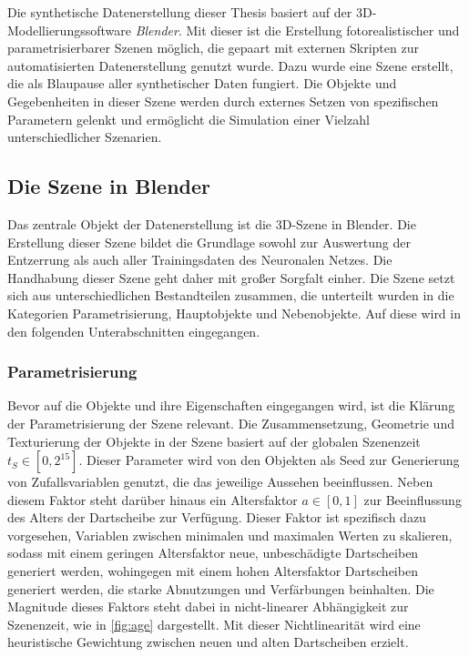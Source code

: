 Die synthetische Datenerstellung dieser Thesis basiert auf der 3D-Modellierungssoftware \textit{Blender}\cite{blender}. Mit dieser ist die Erstellung fotorealistischer und parametrisierbarer Szenen möglich, die gepaart mit externen Skripten zur automatisierten Datenerstellung genutzt wurde. Dazu wurde eine Szene erstellt, die als Blaupause aller synthetischer Daten fungiert. Die Objekte und Gegebenheiten in dieser Szene werden durch externes Setzen von spezifischen Parametern gelenkt und ermöglicht die Simulation einer Vielzahl unterschiedlicher Szenarien.

\subsection{Die Szene in Blender}
\label{sec:impl:daten:blender}

Das zentrale Objekt der Datenerstellung ist die 3D-Szene in Blender. Die Erstellung dieser Szene bildet die Grundlage sowohl zur Auswertung der Entzerrung als auch aller Trainingsdaten des Neuronalen Netzes. Die Handhabung dieser Szene geht daher mit großer Sorgfalt einher. Die Szene setzt sich aus unterschiedlichen Bestandteilen zusammen, die unterteilt wurden in die Kategorien Parametrisierung, Hauptobjekte und Nebenobjekte. Auf diese wird in den folgenden Unterabschnitten eingegangen.


\subsubsection{Parametrisierung}
\label{sec:impl:daten:blender:parameter}

Bevor auf die Objekte und ihre Eigenschaften eingegangen wird, ist die Klärung der Parametrisierung der Szene relevant. Die Zusammensetzung, Geometrie und Texturierung der Objekte in der Szene basiert auf der globalen Szenenzeit $t_S \in [0, 2^{15}]$. Dieser Parameter wird von den Objekten als Seed zur Generierung von Zufallsvariablen genutzt, die das jeweilige Aussehen beeinflussen. Neben diesem Faktor steht darüber hinaus ein Altersfaktor $a \in [0, 1]$ zur Beeinflussung des Alters der Dartscheibe zur Verfügung. Dieser Faktor ist spezifisch dazu vorgesehen, Variablen zwischen minimalen und maximalen Werten zu skalieren, sodass mit einem geringen Altersfaktor neue, unbeschädigte Dartscheiben generiert werden, wohingegen mit einem hohen Altersfaktor Dartscheiben generiert werden, die starke Abnutzungen und Verfärbungen beinhalten. Die Magnitude dieses Faktors steht dabei in nicht-linearer Abhängigkeit zur Szenenzeit, wie in \autoref{fig:age} dargestellt. Mit dieser Nichtlinearität wird eine heuristische Gewichtung zwischen neuen und alten Dartscheiben erzielt.

